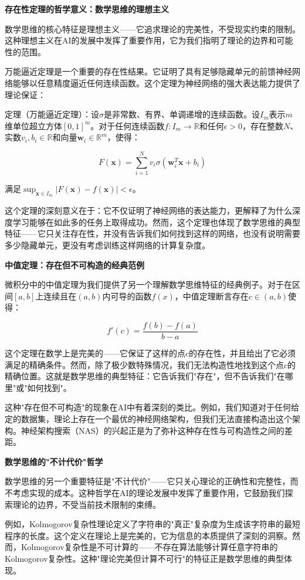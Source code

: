 \textbf{存在性定理的哲学意义：数学思维的理想主义}

数学思维的核心特征是理想主义——它追求理论的完美性，不受现实约束的限制。这种理想主义在AI的发展中发挥了重要作用，它为我们指明了理论的边界和可能性的范围。

万能逼近定理是一个重要的存在性结果。它证明了具有足够隐藏单元的前馈神经网络能够以任意精度逼近任何连续函数。这个定理为神经网络的强大表达能力提供了理论保证：

定理（万能逼近定理）：设$\sigma$是非常数、有界、单调递增的连续函数。设$I_m$表示$m$维单位超立方体$[0,1]^m$。对于任何连续函数$f: I_m \to \mathbb{R}$和任何$\epsilon > 0$，存在整数$N$、实数$v_i, b_i \in \mathbb{R}$和向量$\mathbf{w}_i \in \mathbb{R}^m$，使得：

$$F(\mathbf{x}) = \sum_{i=1}^{N} v_i \sigma(\mathbf{w}_i^T \mathbf{x} + b_i)$$

满足$\sup_{\mathbf{x} \in I_m} |F(\mathbf{x}) - f(\mathbf{x})| < \epsilon$。

这个定理的深刻意义在于：它不仅证明了神经网络的表达能力，更解释了为什么深度学习能够在如此多的任务上取得成功。然而，这个定理也体现了数学思维的典型特征——它只关注存在性，并没有告诉我们如何找到这样的网络，也没有说明需要多少隐藏单元，更没有考虑训练这样网络的计算复杂度。

\textbf{中值定理：存在但不可构造的经典范例}

微积分中的中值定理为我们提供了另一个理解数学思维特征的经典例子。对于在区间$[a,b]$上连续且在$(a,b)$内可导的函数$f(x)$，中值定理断言存在$c \in (a,b)$使得：

$$f'(c) = \frac{f(b) - f(a)}{b - a}$$

这个定理在数学上是完美的——它保证了这样的点$c$的存在性，并且给出了它必须满足的精确条件。然而，除了极少数特殊情况，我们无法构造性地找到这个点$c$的精确位置。这就是数学思维的典型特征：它告诉我们"存在"，但不告诉我们"在哪里"或"如何找到"。

这种"存在但不可构造"的现象在AI中有着深刻的类比。例如，我们知道对于任何给定的数据集，理论上存在一个最优的神经网络架构，但我们无法直接构造出这个架构。神经架构搜索（NAS）的兴起正是为了弥补这种存在性与可构造性之间的差距。

\textbf{数学思维的"不计代价"哲学}

数学思维的另一个重要特征是"不计代价"——它只关心理论的正确性和完整性，而不考虑实现的成本。这种哲学在AI的理论发展中发挥了重要作用，它鼓励我们探索理论的边界，不受当前技术限制的束缚。

例如，Kolmogorov复杂性理论定义了字符串的"真正"复杂度为生成该字符串的最短程序的长度。这个定义在理论上是完美的，它为信息的本质提供了深刻的洞察。然而，Kolmogorov复杂性是不可计算的——不存在算法能够计算任意字符串的Kolmogorov复杂性。这种"理论完美但计算不可行"的特征正是数学思维的典型体现。

